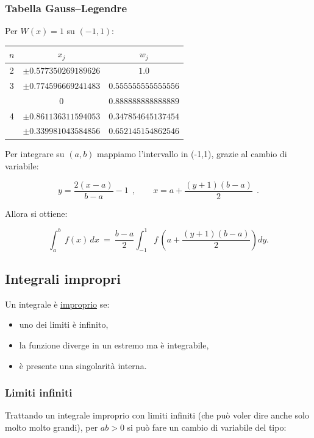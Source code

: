 \documentclass{article}
\begin{document}
	\subsubsection{Tabella Gauss–Legendre}
	
	Per $W(x)=1$ su $(-1,1)$:
	
	\begin{center}
		\begin{tabular}{|c|c|c|}
			\hline
			$n$ & $x_j$ & $w_j$ \\
			\hline
			2 & $\pm 0.577350269189626$ & $1.0$ \\
			\hline
			3 & $\pm 0.774596669241483$ & $0.555555555555556$ \\
			& $0$ & $0.888888888888889$ \\
			\hline
			4 & $\pm 0.861136311594053$ & $0.347854645137454$ \\
			& $\pm 0.339981043584856$ & $0.652145154862546$ \\
			\hline
		\end{tabular}
	\end{center}
	
	Per integrare su $(a,b)$ mappiamo l'intervallo in (-1,1), grazie al cambio di variabile:
	
	\[
	y = \frac{2(x-a)}{b-a} - 1 \ \ ,
	\qquad
	x = a + \frac{(y+1)(b-a)}{2}\ \ .
	\]
	
	Allora si ottiene:
	
	\[
	\int_a^b\, f(x)\,dx
	\ =\
	\frac{b-a}{2}
	\int_{-1}^{1}
	f\! \,\left(a + \frac{(y+1)(b-a)}{2}\right) dy.
	\]
	
	\subsection{Integrali impropri}
	
	Un integrale è \underline{improprio} se:
	
	\begin{itemize}
		\item uno dei limiti è infinito,
		\item la funzione diverge in un estremo ma è integrabile,
		\item è presente una singolarità interna.
	\end{itemize}
	
	\subsubsection{Limiti infiniti}
	
	Trattando un integrale improprio con limiti infiniti (che può voler dire anche solo molto molto grandi), per $ab>0$ si può fare un cambio di variabile del tipo:
	
\end{document}
